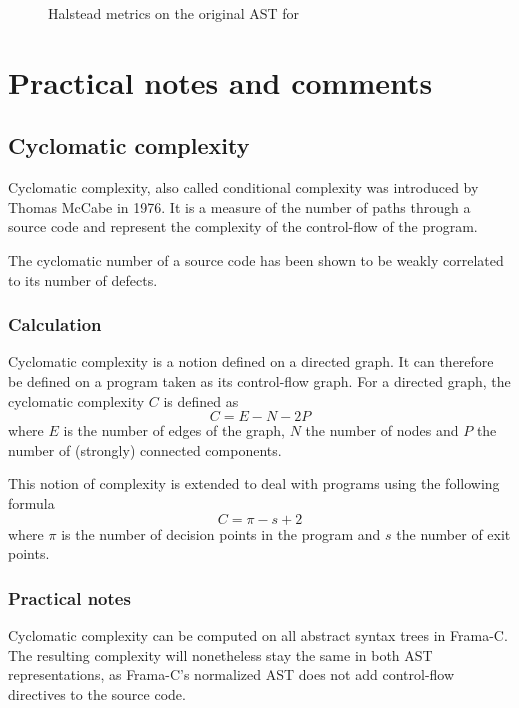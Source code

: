 \documentclass{frama-c-book}
\begin{document}
\begin{figure}
  \centering
  
  \caption{Halstead metrics on the original AST for \pgname}
  \label{fig:cabs_metrics_halstead}
\end{figure}


\chapter{Practical notes and comments}
\label{cha:pract-notes-comm}

\section{Cyclomatic complexity}
\label{sec:cycl-compl}

Cyclomatic complexity, also called conditional complexity was introduced by
Thomas \mbox{McCabe} \cite{DBLP:journals/tse/McCabe76} in 1976. It is a measure of the
number of paths through a source code and represent the complexity of the
control-flow of the program.

The cyclomatic number of a source code has been shown to be weakly correlated to
its number of defects.

\subsection{Calculation}

Cyclomatic complexity is a notion defined on a directed graph. It can therefore
be defined on a program taken as its control-flow graph. For a directed graph,
the cyclomatic complexity $C$ is defined as
\[ C = E - N - 2P \] where $E$ is the number of edges of the graph, $N$ the
number of nodes and $P$ the number of (strongly) connected components.

This notion of complexity is extended to deal with programs using the following
formula
\[ C = \pi - s + 2 \]
where $\pi$ is the number of decision points in the program
and $s$ the number of exit points.



\subsection{Practical notes}

Cyclomatic complexity can be computed on all abstract syntax trees in
Frama-C. The resulting complexity will nonetheless stay the same in both AST
representations, as Frama-C's normalized AST does not add control-flow
directives to the source code.
\end{document}
